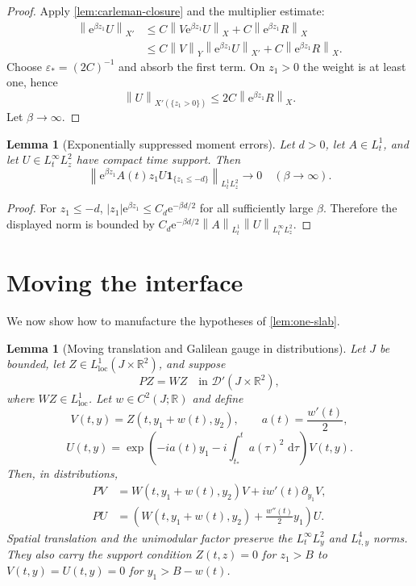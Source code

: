 \documentclass[11pt,oneside]{book}
\newtheorem{lemma}[theorem]{Lemma}
\theoremstyle{definition}
\theoremstyle{remark}
\newcommand{\R}{\mathbb R}
\newcommand{\D}{\mathcal D}
\newcommand{\1}{\mathbf 1}
\newcommand{\loc}{\mathrm{loc}}
\newcommand{\dd}{\,\mathrm d}
\newcommand{\norm}[1]{\left\lVert #1\right\rVert}
\newcommand{\e}{\mathrm e}
\newcommand{\eps}{\varepsilon}
\begin{document}
\begin{proof}
Apply \cref{lem:carleman-closure} and the multiplier estimate:
\begin{align*}
 \norm{\e^{\beta z_1}U}_{X'}
 &\le C\norm{V\e^{\beta z_1}U}_{X}
      +C\norm{\e^{\beta z_1}R}_{X}\\
 &\le C\norm V_Y\norm{\e^{\beta z_1}U}_{X'}
      +C\norm{\e^{\beta z_1}R}_{X}.
\end{align*}
Choose $\eps_*=(2C)^{-1}$ and absorb the first term.  On $z_1>0$ the weight
is at least one, hence
\[
 \norm{U}_{X'(\{z_1>0\})}
 \le2C\norm{\e^{\beta z_1}R}_{X}.
\]
Let $\beta\to\infty$.
\end{proof}

\begin{lemma}[Exponentially suppressed moment errors]\label{lem:moment-error}
Let $d>0$, let $A\in L^1_t$, and let
$U\in L^\infty_tL^2_z$ have compact time support.  Then
\begin{equation}
 \norm{\e^{\beta z_1}A(t)z_1U\1_{\{z_1\le-d\}}}_{L^1_tL^2_z}
 \longrightarrow0\quad(\beta\to\infty).           \label{eq:moment-error-decay}
\end{equation}
\end{lemma}

\begin{proof}
For $z_1\le-d$,
$|z_1|\e^{\beta z_1}\le C_d\e^{-\beta d/2}$ for all sufficiently large
$\beta$.  Therefore the displayed norm is bounded by
$C_d\e^{-\beta d/2}\norm A_{L^1_t}\norm U_{L^\infty_tL^2_z}$.
\end{proof}

\section{Moving the interface}
We now show how to manufacture the hypotheses of \cref{lem:one-slab}.

\begin{lemma}[Moving translation and Galilean gauge in distributions]
\label{lem:moving-galilean-distribution}
Let $J$ be bounded, let
$Z\in L^1_{\loc}(J\times\R^2)$, and suppose
\[
 PZ=WZ
 \quad\text{in }\D'(J\times\R^2),
\]
where $WZ\in L^1_{\loc}$.  Let $w\in C^2(J;\R)$ and define
\[
 V(t,y)=Z(t,y_1+w(t),y_2),
 \qquad a(t)=\frac{w'(t)}2,
\]
\begin{equation}
 U(t,y)=
 \exp\!\left(-ia(t)y_1-i\int_{t_*}^t a(\tau)^2\,\dd\tau\right)V(t,y).
 \label{eq:moving-gauge-definition}
\end{equation}
Then, in distributions,
\begin{align}
 PV&=W(t,y_1+w(t),y_2)V+iw'(t)\partial_{y_1}V,
                                                        \label{eq:moving-translation-distribution}\\
 PU&=\left(W(t,y_1+w(t),y_2)+\frac{w''(t)}2y_1\right)U. \label{eq:moving-gauge-distribution}
\end{align}
Spatial translation and the unimodular factor preserve the
$L^\infty_tL^2_y$ and $L^4_{t,y}$ norms.  They also carry the support
condition $Z(t,z)=0$ for $z_1>B$ to
$V(t,y)=U(t,y)=0$ for $y_1>B-w(t)$.
\end{lemma}
\end{document}
